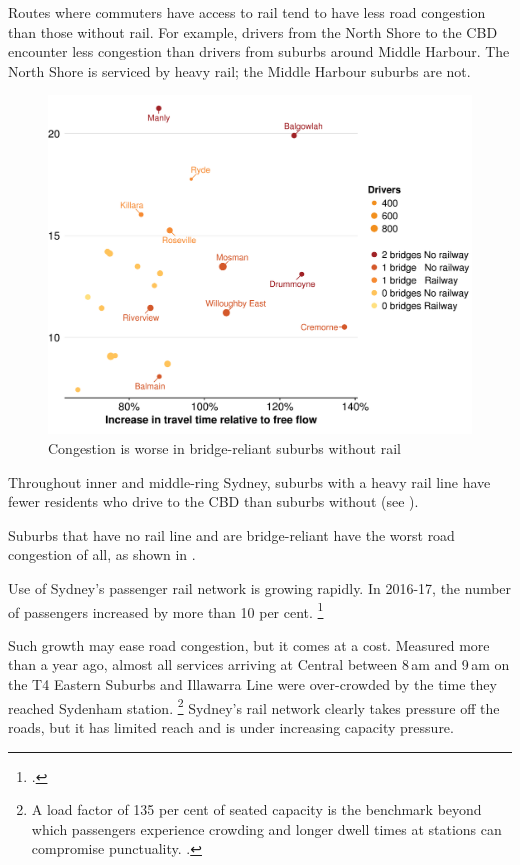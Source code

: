 \documentclass{grattan}
\begin{document}
Routes where commuters have access to rail tend to have less road congestion than those without rail.
For example, drivers from the North Shore to the CBD encounter less congestion than drivers from suburbs around Middle Harbour.
The North Shore is serviced by heavy rail; the Middle Harbour suburbs are not.

\begin{figure}
\caption{Congestion is worse in bridge-reliant suburbs without rail}\label{fig:railways-and-bridges-have-worst-congestion}
\includegraphics[width=1.125\columnwidth]{atlas/scatter-increase-in-travel-time-vs-free-flow-ratio--Sydney-1.pdf}
\end{figure}

Throughout inner and middle-ring Sydney, suburbs with a heavy rail line have fewer residents who drive to the CBD than suburbs without (see ).

Suburbs that have no rail line and are bridge-reliant have the worst road congestion of all, as shown in .

Use of Sydney's passenger rail network is growing rapidly.
In 2016-17, the number of passengers increased by more than 10 per cent.%
\footcite{TrNSW-2017-MonthlyTransportPatronage}

Such growth may ease road congestion, but it comes at a cost. Measured more than a year ago, almost all services arriving at Central between 8\,am and 9\,am on the T4 Eastern Suburbs and Illawarra Line were over-crowded by the time they reached Sydenham station.%
    \footnote{A load factor of 135 per cent of seated capacity is the benchmark beyond which passengers experience crowding and longer dwell times at stations can compromise punctuality. \textcite[][March~2016]{TrNSW-2017-TrainLoadsByLine}.}
Sydney's rail network clearly takes pressure off the roads, but it has limited reach and is under increasing capacity pressure.
\end{document}
